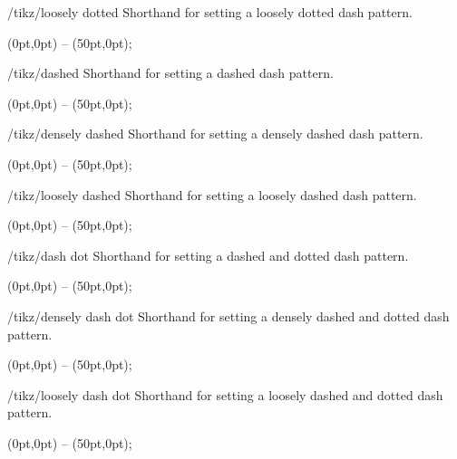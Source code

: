 \begin{stylekey}{/tikz/loosely dotted}
    Shorthand for setting a loosely dotted dash pattern.
\begin{codeexample}[]
\tikz {} (0pt,0pt) -- (50pt,0pt);
\end{codeexample}
\end{stylekey}

\begin{stylekey}{/tikz/dashed}
    Shorthand for setting a dashed dash pattern.
\begin{codeexample}[]
\tikz \draw[dashed] (0pt,0pt) -- (50pt,0pt);
\end{codeexample}
\end{stylekey}

\begin{stylekey}{/tikz/densely dashed}
    Shorthand for setting a densely dashed dash pattern.
\begin{codeexample}[]
\tikz {} (0pt,0pt) -- (50pt,0pt);
\end{codeexample}
\end{stylekey}

\begin{stylekey}{/tikz/loosely dashed}
    Shorthand for setting a loosely dashed dash pattern.
\begin{codeexample}[]
\tikz {} (0pt,0pt) -- (50pt,0pt);
\end{codeexample}
\end{stylekey}

\begin{stylekey}{/tikz/dash dot}
    Shorthand for setting a dashed and dotted dash pattern.
\begin{codeexample}[]
\tikz {} (0pt,0pt) -- (50pt,0pt);
\end{codeexample}
\end{stylekey}

\begin{stylekey}{/tikz/densely dash dot}
    Shorthand for setting a densely dashed and dotted dash pattern.
\begin{codeexample}[]
\tikz {} (0pt,0pt) -- (50pt,0pt);
\end{codeexample}
\end{stylekey}

\begin{stylekey}{/tikz/loosely dash dot}
    Shorthand for setting a loosely dashed and dotted dash pattern.
\begin{codeexample}[]
\tikz {} (0pt,0pt) -- (50pt,0pt);
\end{codeexample}
\end{stylekey}

